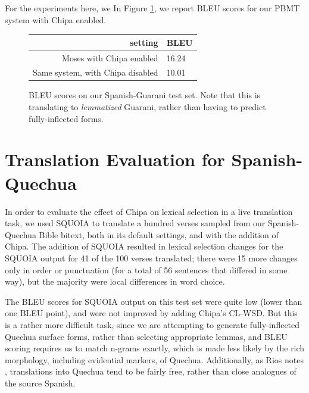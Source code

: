 For the experiments here, we 
In Figure \ref{fig:bleu-es-gn}, we report BLEU scores for our PBMT system with
Chipa enabled.

\begin{figure}
  \begin{centering}
  \begin{tabulary}{\textwidth}{|R|L|}
    \hline
    setting & BLEU \\
    \hline
    Moses with Chipa enabled &  16.24 \\
    \hline
    Same system, with Chipa disabled &  10.01 \\
    \hline
  \end{tabulary}
  \end{centering}
  \caption{BLEU scores on our Spanish-Guarani test set. Note that this is
  translating to \emph{lemmatized} Guarani, rather than having to predict
  fully-inflected forms.}
  \label{fig:bleu-es-gn}
\end{figure}


\section{Translation Evaluation for Spanish-Quechua}

In order to evaluate the effect of Chipa on lexical selection in a live
translation task, we used SQUOIA to translate a hundred verses sampled from our
Spanish-Quechua Bible bitext, both in its default settings, and with the
addition of Chipa. The addition of SQUOIA resulted in lexical selection changes
for the SQUOIA output for 41 of the 100 verses translated; there were 15 more
changes only in order or punctuation (for a total of 56 sentences that differed
in some way), but the majority were local differences in word choice.

The BLEU scores for SQUOIA output on this test set were quite low (lower than
one BLEU point), and were not improved by adding Chipa's CL-WSD. But this is a
rather more difficult task, since we are attempting to generate fully-inflected
Quechua surface forms, rather than selecting appropriate lemmas, and BLEU
scoring requires us to match n-grams exactly, which is made less likely by the
rich morphology, including evidential markers, of Quechua. Additionally, as
Rios notes \cite[\S 5.9]{rios2015basic}, translations into Quechua tend to be
fairly free, rather than close analogues of the source Spanish.

